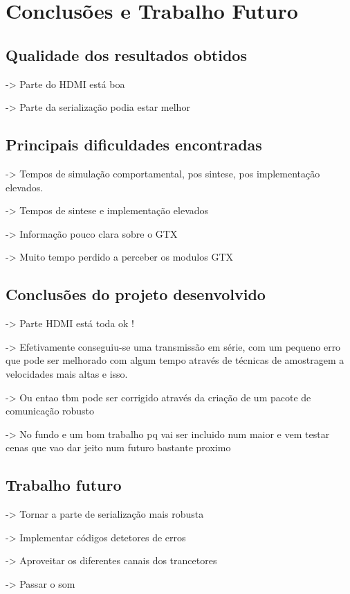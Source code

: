 \chapter{Conclusões e Trabalho Futuro} \label{chap:concl}

\section{Qualidade dos resultados obtidos}
-> Parte do HDMI está boa

-> Parte da serialização podia estar melhor


\section{Principais dificuldades encontradas}

-> Tempos de simulação comportamental, pos sintese, pos implementação elevados.

-> Tempos de sintese e implementação elevados

-> Informação pouco clara sobre o GTX

-> Muito tempo perdido a perceber os modulos GTX

\section{Conclusões do projeto desenvolvido}

-> Parte HDMI está toda ok !

-> Efetivamente conseguiu-se uma transmissão em série, com um pequeno erro que pode ser melhorado com algum tempo através de técnicas de amostragem a velocidades mais altas e isso.

-> Ou entao tbm pode ser corrigido através da criação de um pacote de comunicação robusto

-> No fundo e um bom trabalho pq vai ser incluido num maior e vem testar cenas que vao dar jeito num futuro bastante proximo


\section{Trabalho futuro}

-> Tornar a parte de serialização mais robusta

-> Implementar códigos detetores de erros

-> Aproveitar os diferentes canais dos trancetores

-> Passar o som 